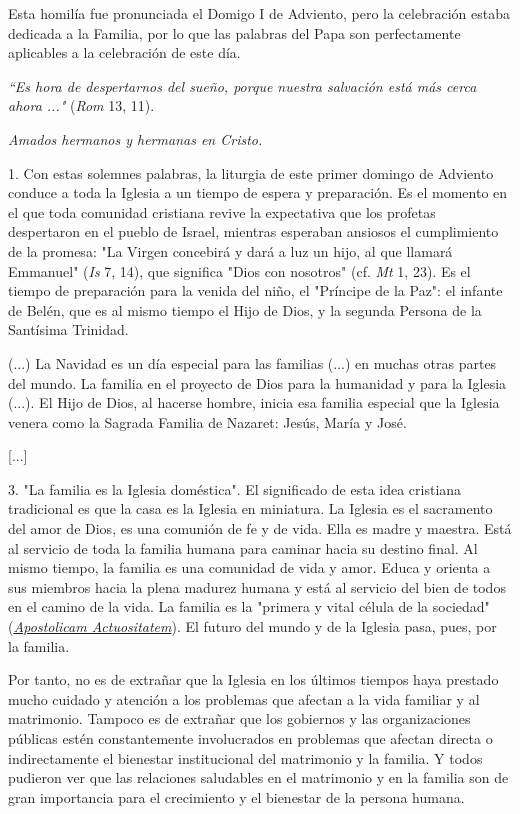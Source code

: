 Esta homilía fue pronunciada el Domigo I de Adviento, pero la celebración estaba dedicada a la Familia, por lo que las palabras del Papa son perfectamente aplicables a la celebración de este día.

\emph{``Es hora de despertarnos del sueño, porque nuestra salvación está
	más cerca ahora ..."} (\emph{Rom} 13, 11).

\emph{Amados hermanos y hermanas en Cristo.}

1. Con estas solemnes palabras, la liturgia de este primer domingo de
Adviento conduce a toda la Iglesia a un tiempo de espera y preparación.
Es el momento en el que toda comunidad cristiana revive la expectativa
que los profetas despertaron en el pueblo de Israel, mientras esperaban
ansiosos el cumplimiento de la promesa: "La Virgen concebirá y dará a
luz un hijo, al que llamará Emmanuel" (\emph{Is} 7, 14), que significa
"Dios con nosotros" (cf. \emph{Mt} 1, 23). Es el tiempo de preparación
para la venida del niño, el "Príncipe de la Paz": el infante de Belén,
que es al mismo tiempo el Hijo de Dios, y la segunda Persona de la
Santísima Trinidad.

(...) La Navidad es un día especial para las familias (...) en muchas
otras partes del mundo. La familia en el proyecto de Dios para la
humanidad y para la Iglesia (...). El Hijo de Dios, al hacerse hombre,
inicia esa familia especial que la Iglesia venera como la Sagrada
Familia de Nazaret: Jesús, María y José.

{[}...{]}

3. "La familia es la Iglesia doméstica". El significado de esta idea
cristiana tradicional es que la casa es la Iglesia en miniatura. La
Iglesia es el sacramento del amor de Dios, es una comunión de fe y de
vida. Ella es madre y maestra. Está al servicio de toda la familia
humana para caminar hacia su destino final. Al mismo tiempo, la familia
es una comunidad de vida y amor. Educa y orienta a sus miembros hacia la
plena madurez humana y está al servicio del bien de todos en el camino
de la vida. La familia es la "primera y vital célula de la sociedad"
(\href{http://www.vatican.va/archive/hist_councils/ii_vatican_council/documents/vat-ii_decree_19651118_apostolicam-actuositatem_it.html}{\emph{\emph{Apostolicam
			Actuositatem}}}). El futuro del mundo y de la Iglesia pasa, pues, por la
familia.

Por tanto, no es de extrañar que la Iglesia en los últimos tiempos haya
prestado mucho cuidado y atención a los problemas que afectan a la vida
familiar y al matrimonio. Tampoco es de extrañar que los gobiernos y las
organizaciones públicas estén constantemente involucrados en problemas
que afectan directa o indirectamente el bienestar institucional del
matrimonio y la familia. Y todos pudieron ver que las relaciones
saludables en el matrimonio y en la familia son de gran importancia para
el crecimiento y el bienestar de la persona humana.

